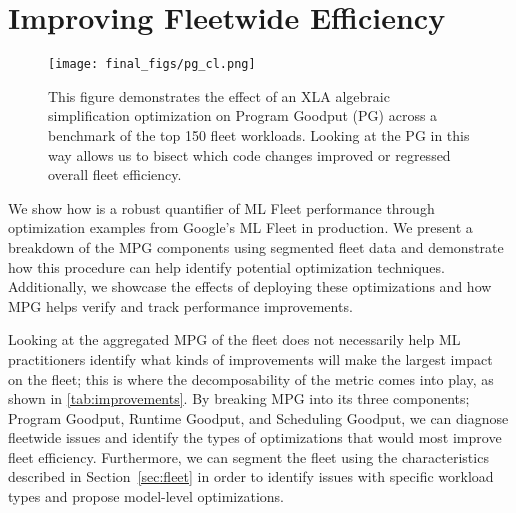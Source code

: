 \section{Improving Fleetwide Efficiency}\label{sec:improvements}
 \begin{figure}[t]
    \centering
    \texttt{[image: final\_figs/pg\_cl.png]}
    \caption{This figure demonstrates the effect of an XLA algebraic simplification optimization on Program Goodput (PG) across a benchmark of the top 150 fleet workloads. Looking at the PG in this way allows us to bisect which code changes improved or regressed overall fleet efficiency.}
    \label{fig:pg_cl}
\end{figure}

We show how \mpg is a robust quantifier of ML Fleet performance through optimization examples from Google's ML Fleet in production. We present a breakdown of the MPG components using segmented fleet data and demonstrate how this procedure can help identify potential optimization techniques. Additionally, we showcase the effects of deploying these optimizations and how MPG helps verify and track performance improvements.

Looking at the aggregated MPG of the fleet does not necessarily help ML practitioners identify what kinds of improvements will make the largest impact on the fleet; this is where the decomposability of the metric comes into play, as shown in \autoref{tab:improvements}. By breaking MPG into its three components; Program Goodput, Runtime Goodput, and Scheduling Goodput, we can diagnose fleetwide issues and identify the types of optimizations that would most improve fleet efficiency. Furthermore, we can segment the fleet using the characteristics described in Section~\ref{sec:fleet} in order to identify issues with specific workload types and propose model-level optimizations. 


